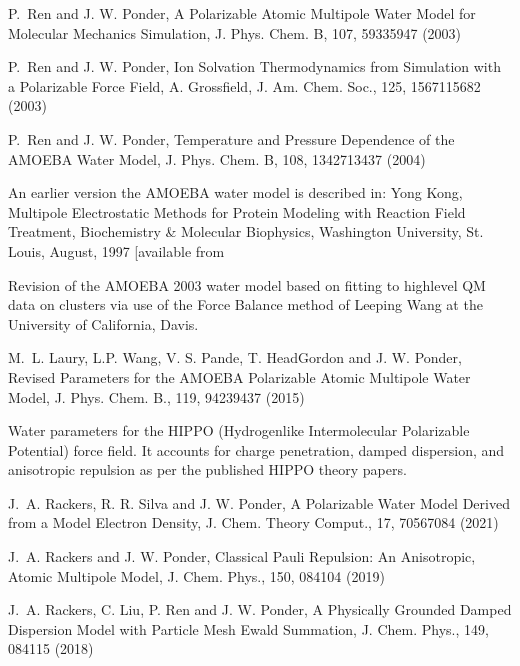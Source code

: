 \documentclass[letterpaper,11pt,english]{sphinxmanual}
\begin{document}
\sphinxAtStartPar
P. Ren and J. W. Ponder, A Polarizable Atomic Multipole Water Model for Molecular Mechanics Simulation, J. Phys. Chem. B, 107, 5933\sphinxhyphen{}5947 (2003)

\sphinxAtStartPar
P. Ren and J. W. Ponder, Ion Solvation Thermodynamics from Simulation with a Polarizable Force Field, A. Grossfield, J. Am. Chem. Soc., 125, 15671\sphinxhyphen{}15682 (2003)

\sphinxAtStartPar
P. Ren and J. W. Ponder, Temperature and Pressure Dependence of the AMOEBA Water Model, J. Phys. Chem. B, 108, 13427\sphinxhyphen{}13437 (2004)

\sphinxAtStartPar
An earlier version the AMOEBA water model is described in: Yong Kong, Multipole Electrostatic Methods for Protein Modeling with Reaction Field Treatment, Biochemistry \& Molecular Biophysics, Washington University, St. Louis, August, 1997 {[}available from \sphinxurl{http://dasher.wustl.edu/ponder/}{]}

\sphinxAtStartPar
{}

\sphinxAtStartPar
Revision of the AMOEBA 2003 water model based on fitting to high\sphinxhyphen{}level QM data on clusters via use of the Force Balance method of Leeping Wang at the University of California, Davis.

\sphinxAtStartPar
M. L. Laury, L.\sphinxhyphen{}P. Wang, V. S. Pande, T. Head\sphinxhyphen{}Gordon and J. W. Ponder, Revised Parameters for the AMOEBA Polarizable Atomic Multipole Water Model,  J. Phys. Chem. B., 119, 9423\sphinxhyphen{}9437 (2015)

\sphinxAtStartPar
{}

\sphinxAtStartPar
Water parameters for the HIPPO (Hydrogen\sphinxhyphen{}like Intermolecular Polarizable Potential) force field. It accounts for charge penetration, damped dispersion, and anisotropic repulsion as per the published HIPPO theory papers.

\sphinxAtStartPar
J. A. Rackers, R. R. Silva and J. W. Ponder, A Polarizable Water Model Derived from a Model Electron Density, J. Chem. Theory Comput., 17, 7056\sphinxhyphen{}7084 (2021)

\sphinxAtStartPar
J. A. Rackers and J. W. Ponder, Classical Pauli Repulsion: An Anisotropic, Atomic Multipole Model, J. Chem. Phys., 150, 084104 (2019)

\sphinxAtStartPar
J. A. Rackers, C. Liu, P. Ren and J. W. Ponder, A Physically Grounded Damped Dispersion Model with Particle Mesh Ewald Summation, J. Chem. Phys., 149, 084115 (2018)
\end{document}
